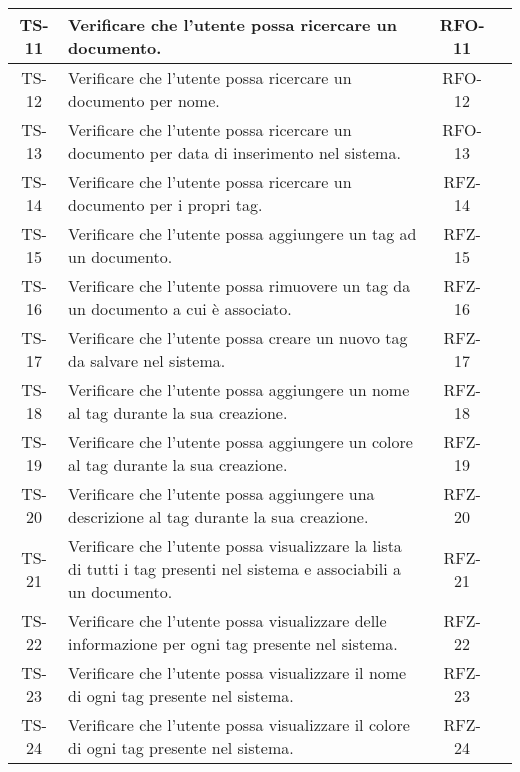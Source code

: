 \begin{xltabular}{\textwidth}{| c | X | c | c |}
    \hline
    TS-11 & Verificare che l’utente possa ricercare un documento. & RFO-11 & \textcolor{cmarkcolor}{} \\
    \hline
    TS-12 & Verificare che l’utente possa ricercare un documento per nome. & RFO-12 & \textcolor{cmarkcolor}{}\\
    \hline
    TS-13 & Verificare che l’utente possa ricercare un documento per data di inserimento nel sistema. & RFO-13 & \textcolor{cmarkcolor}{} \\
    \hline
    TS-14 & Verificare che l’utente possa ricercare un documento per i propri tag. & RFZ-14 & \textcolor{xmarkcolor}{} \\
    \hline
    TS-15 & Verificare che l’utente possa aggiungere un tag ad un documento. & RFZ-15 & \textcolor{cmarkcolor}{} \\
    \hline
    TS-16 & Verificare che l’utente possa rimuovere un tag da un documento a cui è associato. & RFZ-16 & \textcolor{cmarkcolor}{} \\
    \hline
    TS-17 & Verificare che l’utente possa creare un nuovo tag da salvare nel sistema. & RFZ-17 & \textcolor{xmarkcolor}{} \\
    \hline
    TS-18 & Verificare che l’utente possa aggiungere un nome al tag durante la sua creazione. & RFZ-18 & \textcolor{xmarkcolor}{} \\
    \hline
    TS-19 & Verificare che l’utente possa aggiungere un colore al tag durante la sua creazione. & RFZ-19 & \textcolor{xmarkcolor}{} \\
    \hline
    TS-20 & Verificare che l’utente possa aggiungere una descrizione al tag durante la sua creazione. & RFZ-20 & \textcolor{xmarkcolor}{} \\
    \hline
    TS-21 &  Verificare che l’utente possa visualizzare la lista di tutti i tag presenti nel sistema e associabili a un documento. & RFZ-21 & \textcolor{xmarkcolor}{} \\
    \hline
    TS-22 & Verificare che l'utente possa visualizzare delle informazione per ogni tag presente nel sistema. & RFZ-22 & \textcolor{xmarkcolor}{} \\
    \hline
    TS-23 & Verificare che l'utente possa visualizzare il nome di ogni tag presente nel sistema. & RFZ-23 & \textcolor{xmarkcolor}{} \\
    \hline
    TS-24 & Verificare che l’utente possa visualizzare il colore di ogni tag presente nel sistema. & RFZ-24 & \textcolor{xmarkcolor}{} \\

\end{xltabular}
